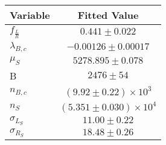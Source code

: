 \begin{tabular}[t]{lc}
\hline
Variable &Fitted Value\\
\hline\hline
$f_{\frac{L}{R}}$&$0.441\pm0.022$\\
\hline
$\lambda_{B,c}$&$-0.00126\pm0.00017$\\
\hline
$\mu_S$&$5278.895\pm0.078$\\
\hline
B&$2476\pm54$\\
\hline
$n_{B,c}$&$(9.92\pm0.22)\times 10^3$\\
\hline
$n_S$&$(5.351\pm0.030)\times 10^4$\\
\hline
$\sigma_{L_S}$&$11.00\pm0.22$\\
\hline
$\sigma_{R_S}$&$18.48\pm0.26$\\
\hline
\end{tabular}